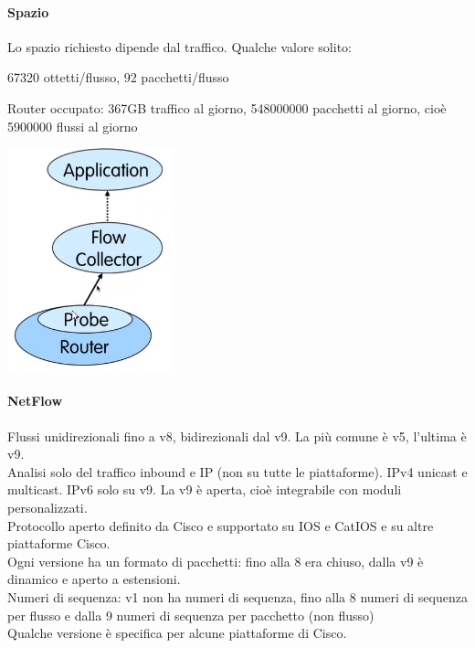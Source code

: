 \documentclass[10pt]{book}
\begin{document}
\paragraph{Spazio} Lo spazio richiesto dipende dal traffico. Qualche valore solito:
\begin{list}{}{}
	\item 67320 ottetti/flusso, 92 pacchetti/flusso
	\item Router occupato: 367GB traffico al giorno, 548000000 pacchetti al giorno, cioè 5900000 flussi al giorno
	\item %
\end{list}
\begin{multicols}{2}
\begin{center}
	\includegraphics[scale=0.5]{netflow.png}
\end{center}
\columnbreak
\paragraph{NetFlow} Flussi unidirezionali fino a v8, bidirezionali dal v9. La più comune è v5, l'ultima è v9.\\
Analisi solo del traffico inbound e IP (non su tutte le piattaforme). IPv4 unicast e multicast. IPv6 solo su v9. La v9 è aperta, cioè integrabile con moduli personalizzati.\\
Protocollo aperto definito da Cisco e supportato su IOS e CatIOS e su altre piattaforme Cisco.\\
Ogni versione ha un formato di pacchetti: fino alla 8 era chiuso, dalla v9 è dinamico e aperto a estensioni.\\
Numeri di sequenza: v1 non ha numeri di sequenza, fino alla 8 numeri di sequenza per flusso e dalla 9 numeri di sequenza per pacchetto (non flusso)\\
Qualche versione è specifica per alcune piattaforme di Cisco.
\end{multicols}
\end{document}
